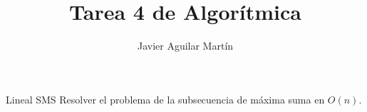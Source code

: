 \documentclass[twoside]{article}
\begin{document}
\title{Tarea 4 de Algorítmica}
\author{Javier Aguilar Martín}
\maketitle


\begin{ejercicio}{Lineal SMS}
Resolver el problema de la subsecuencia de máxima suma en $O(n)$.
\end{ejercicio}
\begin{solucion}

\end{solucion}
\end{document}
